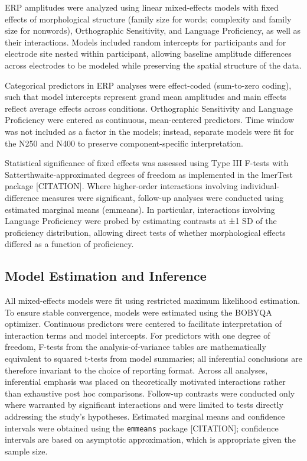 \documentclass[utf8]{FrontiersinHarvard} %
\begin{document}
ERP amplitudes were analyzed using linear mixed-effects models with fixed effects of morphological structure (family size for words; complexity and family size for nonwords), Orthographic Sensitivity, and Language Proficiency, as well as their interactions. Models included random intercepts for participants and for electrode site nested within participant, allowing baseline amplitude differences across electrodes to be modeled while preserving the spatial structure of the data.

Categorical predictors in ERP analyses were effect-coded (sum-to-zero coding), such that model intercepts represent grand mean amplitudes and main effects reflect average effects across conditions. Orthographic Sensitivity and Language Proficiency were entered as continuous, mean-centered predictors. Time window was not included as a factor in the models; instead, separate models were fit for the N250 and N400 to preserve component-specific interpretation.

Statistical significance of fixed effects was assessed using Type III F-tests with Satterthwaite-approximated degrees of freedom as implemented in the lmerTest package [CITATION]. Where higher-order interactions involving individual-difference measures were significant, follow-up analyses were conducted using estimated marginal means (emmeans). In particular, interactions involving Language Proficiency were probed by estimating contrasts at ±1 SD of the proficiency distribution, allowing direct tests of whether morphological effects differed as a function of proficiency.

\subsection{Model Estimation and Inference}
All mixed-effects models were fit using restricted maximum likelihood estimation. To ensure stable convergence, models were estimated using the BOBYQA optimizer. Continuous predictors were centered to facilitate interpretation of interaction terms and model intercepts. For predictors with one degree of freedom, F-tests from the analysis-of-variance tables are mathematically equivalent to squared t-tests from model summaries; all inferential conclusions are therefore invariant to the choice of reporting format. Across all analyses, inferential emphasis was placed on theoretically motivated interactions rather than exhaustive post hoc comparisons. Follow-up contrasts were conducted only where warranted by significant interactions and were limited to tests directly addressing the study’s hypotheses. Estimated marginal means and confidence intervals were obtained using the \texttt{emmeans} package [CITATION]; confidence intervals are based on asymptotic approximation, which is appropriate given the sample size.
\end{document}
